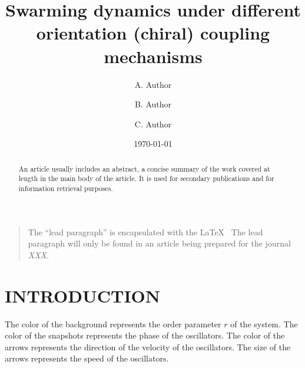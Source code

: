 \documentclass[%
 aip,
 amsmath,amssymb,
 reprint,%
]{revtex4-1}
\begin{document}

\title[Swarming dynamics under different orientation (chiral) coupling mechanisms]{Swarming dynamics under different orientation (chiral) coupling mechanisms\\ \;}
\author{A. Author}
\author{B. Author}%
%

\author{C. Author}
%

\date{\today}%

\begin{abstract}
    An article usually includes an abstract, a concise summary of the work
    covered at length in the main body of the article. It is used for
    secondary publications and for information retrieval purposes. 
\end{abstract}

\maketitle

\begin{quotation}
    The ``lead paragraph'' is encapsulated with the \LaTeX\
    The lead paragraph will only be found in an article being prepared for the journal \textit{XXX}.
\end{quotation}

\section{\label{sec:level1}INTRODUCTION\protect\\ }
The color of the background represents the order parameter $r$ of the system. The color of the snapshots represents the phase of the oscillators. The color of the arrows represents the direction of the velocity of the oscillators. The size of the arrows represents the speed of the oscillators. 
\end{document}
